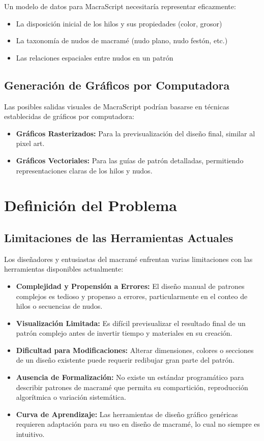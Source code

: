 \documentclass[conference]{IEEEtran}
\begin{document}
Un modelo de datos para MacraScript necesitaría representar eficazmente:

\begin{itemize}
    \item La disposición inicial de los hilos y sus propiedades (color, grosor)
    \item La taxonomía de nudos de macramé (nudo plano, nudo festón, etc.)
    \item Las relaciones espaciales entre nudos en un patrón
\end{itemize}

\subsection{Generación de Gráficos por Computadora}
Las posibles salidas visuales de MacraScript podrían basarse en técnicas establecidas de gráficos por computadora:

\begin{itemize}
    \item \textbf{Gráficos Rasterizados:} Para la previsualización del diseño final, similar al pixel art.
    \item \textbf{Gráficos Vectoriales:} Para las guías de patrón detalladas, permitiendo representaciones claras de los hilos y nudos.
\end{itemize}

\section{Definición del Problema}
\subsection{Limitaciones de las Herramientas Actuales}
Los diseñadores y entusiastas del macramé enfrentan varias limitaciones con las herramientas disponibles actualmente:

\begin{itemize}
    \item \textbf{Complejidad y Propensión a Errores:} El diseño manual de patrones complejos es tedioso y propenso a errores, particularmente en el conteo de hilos o secuencias de nudos.
    \item \textbf{Visualización Limitada:} Es difícil previsualizar el resultado final de un patrón complejo antes de invertir tiempo y materiales en su creación.
    \item \textbf{Dificultad para Modificaciones:} Alterar dimensiones, colores o secciones de un diseño existente puede requerir redibujar gran parte del patrón.
    \item \textbf{Ausencia de Formalización:} No existe un estándar programático para describir patrones de macramé que permita su compartición, reproducción algorítmica o variación sistemática.
    \item \textbf{Curva de Aprendizaje:} Las herramientas de diseño gráfico genéricas requieren adaptación para su uso en diseño de macramé, lo cual no siempre es intuitivo.
\end{itemize}
\end{document}

